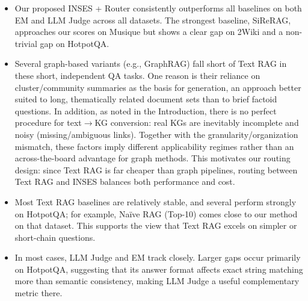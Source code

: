 \documentclass{article}
\theoremstyle{plain}
\theoremstyle{definition}
\theoremstyle{remark}
\begin{document}
\begin{itemize}
\item Our proposed INSES + Router consistently outperforms all baselines on both EM and LLM Judge across all datasets. The strongest baseline, SiReRAG, approaches our scores on Musique but shows a clear gap on 2Wiki and a non-trivial gap on HotpotQA.
\item Several graph-based variants (e.g., GraphRAG) fall short of Text RAG in these short, independent QA tasks. One reason is their reliance on cluster/community summaries as the basis for generation, an approach better suited to long, thematically related document sets than to brief factoid questions. In addition, as noted in the Introduction, there is no perfect procedure for text$\to$KG conversion: real KGs are inevitably incomplete and noisy (missing/ambiguous links). Together with the granularity/organization mismatch, these factors imply different applicability regimes rather than an across-the-board advantage for graph methods. This motivates our routing design: since Text RAG is far cheaper than graph pipelines, routing between Text RAG and INSES balances both performance and cost.
\item Most Text RAG baselines are relatively stable, and several perform strongly on HotpotQA; for example, Naïve RAG (Top-10) comes close to our method on that dataset. This supports the view that Text RAG excels on simpler or short-chain questions.
\item In most cases, LLM Judge and EM track closely. Larger gaps occur primarily on HotpotQA, suggesting that its answer format affects exact string matching more than semantic consistency, making LLM Judge a useful complementary metric there.
\end{itemize}

\end{document}
